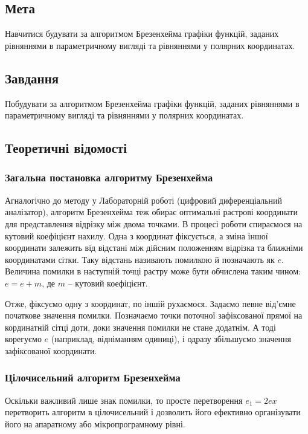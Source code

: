 \documentclass[a4paper,14pt]{extarticle} %
\begin{document}


\newpage

\subsection*{Мета}
Навчитися будувати за алгоритмом Брезенхейма графіки функцій, заданих рівняннями 
в параметричному вигляді та рівняннями у полярних координатах.

\subsection*{Завдання} 
Побудувати за алгоритмом Брезенхейма графіки функцій, заданих рівняннями в параметричному 
вигляді та рівняннями у полярних координатах.

\subsection*{Теоретичні відомості} 

\subsubsection*{Загальна постановка алгоритму Брезенхейма}

Агналогічно до методу у Лабораторній роботі  (цифровий диференціальний аналізатор), алгоритм 
Брезенхейма теж обирає оптимальні растрові координати для представлення відрізку між двома точками. В процесі 
роботи спираємося на кутовий коефіцієнт нахилу. Одна з координат фіксується, а зміна іншої координати залежить 
від відстані між дійсним положенням відрізка та ближніми координатами сітки. Таку відстань називають помилкою й 
позначають як $e$. Величина помилки в наступній точці растру може бути обчислена таким чином: $e=e+m$, 
де $m$ -- кутовий коефіцієнт.

Отже, фіксуємо одну з координат, по іншій рухаємося. Задаємо певне від'ємне початкове значення помилки. Позначаємо 
точки поточної зафіксованої прямої на кординатній сітці доти, доки значення помилки не стане додатнім. А тоді 
корегуємо $e$ (наприклад, відніманням одиниці), і одразу збільшуємо значення зафіксованої координати.

\subsubsection*{Цілочисельний алгоритм Брезенхейма}

Оскільки важливий лише знак помилки, то просте перетворення $e_1=2ex$ перетворить алгоритм в цілочисельний і 
дозволить його ефективно організувати його на апаратному або мікропрограмному рівні.
\end{document}
